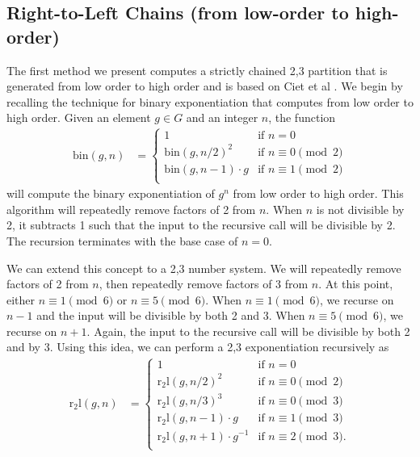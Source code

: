 \documentclass{ucalgthes1}
\theoremstyle{definition}
\begin{document}
\bigbreak
\subsection{Right-to-Left Chains (from low-order to high-order)}
\label{subsec:rtolchains}

The first method we present computes a strictly chained 2,3 partition that is generated from low order to high order and is based on Ciet et al \cite{Ciet2006}.  We begin by recalling the technique for binary exponentiation that computes from low order to high order.  Given an element $g \in G$ and an integer $n$, the function
\begin{align*}
\textrm{bin}(g, n) &= \begin{cases}
               1 & \textrm{if $n = 0$} \\
               {\textrm{bin}(g, n/2)}^2 & \textrm{if $n \equiv 0 \pmod 2$} \\
               \textrm{bin}(g, n-1) \cdot g & \textrm{if $n \equiv 1 \pmod 2$} \\
	       \end{cases}
\end{align*}
will compute the binary exponentiation of $g^n$ from low order to high order. This algorithm will repeatedly remove factors of 2 from $n$.  When $n$ is not divisible by 2, it subtracts 1 such that the input to the recursive call will be divisible by 2.  The recursion terminates with the base case of $n=0$.

We can extend this concept to a 2,3 number system.  We will repeatedly remove factors of 2 from $n$, then repeatedly remove factors of 3 from $n$.  At this point, either $n \equiv 1 \pmod 6$ or $n \equiv 5 \pmod 6$.  When $n \equiv 1 \pmod 6$, we recurse on $n-1$ and the input will be divisible by both 2 and 3.  When $n \equiv 5 \pmod 6$, we recurse on $n+1$.  Again, the input to the recursive call will be divisible by both 2 and by 3.  Using this idea, we can perform a 2,3 exponentiation recursively as
\newcommand{\rtol}{\textrm{r}_2\textrm{l}}
\begin{align*}
\rtol(g, n) &= \begin{cases}
               1 & \textrm{if $n = 0$} \\
               {\rtol(g, n/2)}^2 & \textrm{if $n \equiv 0 \pmod 2$} \\
               {\rtol(g, n/3)}^3 & \textrm{if $n \equiv 0 \pmod 3$} \\
               \rtol(g, n-1) \cdot g & \textrm{if $n \equiv 1 \pmod 3$} \\
               \rtol(g, n+1) \cdot g^{-1} & \textrm{if $n \equiv 2 \pmod 3$}. \\
	       \end{cases}
\end{align*}
\end{document}

